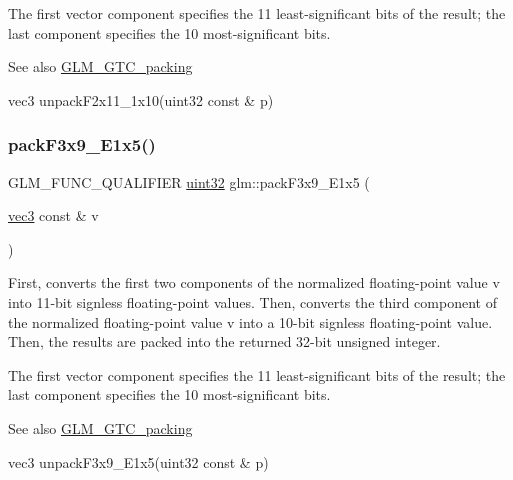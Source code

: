 The first vector component specifies the 11 least-\/significant bits of the result; the last component specifies the 10 most-\/significant bits.

\begin{DoxySeeAlso}{See also}
\hyperlink{group__gtc__packing}{G\+L\+M\+\_\+\+G\+T\+C\+\_\+packing} 

vec3 unpack\+F2x11\+\_\+1x10(uint32 const \& p) 
\end{DoxySeeAlso}
\mbox{\label{group__gtc__packing_ga0984f9598edc648d59a9643d9a61b121}} 
\subsubsection{\texorpdfstring{pack\+F3x9\+\_\+\+E1x5()}{packF3x9\_E1x5()}}
{\footnotesize\ttfamily G\+L\+M\+\_\+\+F\+U\+N\+C\+\_\+\+Q\+U\+A\+L\+I\+F\+I\+ER \hyperlink{group__gtc__type__precision_ga202b6a53c105fcb7e531f9b443518451}{uint32} glm\+::pack\+F3x9\+\_\+\+E1x5 (\begin{DoxyParamCaption}\item[{\hyperlink{group__core__types_ga1c47e8b3386109bc992b6c48e91b0be7}{vec3} const \&}]{v }\end{DoxyParamCaption})}

First, converts the first two components of the normalized floating-\/point value v into 11-\/bit signless floating-\/point values. Then, converts the third component of the normalized floating-\/point value v into a 10-\/bit signless floating-\/point value. Then, the results are packed into the returned 32-\/bit unsigned integer.

The first vector component specifies the 11 least-\/significant bits of the result; the last component specifies the 10 most-\/significant bits.

\begin{DoxySeeAlso}{See also}
\hyperlink{group__gtc__packing}{G\+L\+M\+\_\+\+G\+T\+C\+\_\+packing} 

vec3 unpack\+F3x9\+\_\+\+E1x5(uint32 const \& p) 
\end{DoxySeeAlso}
\mbox{\label{group__gtc__packing_ga896d806b72e390eb953786cca3632ec9}} 
